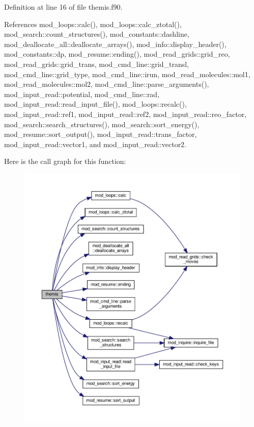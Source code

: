 Definition at line 16 of file themis.\+f90.



References mod\+\_\+loops\+::calc(), mod\+\_\+loops\+::calc\+\_\+ztotal(), mod\+\_\+search\+::count\+\_\+structures(), mod\+\_\+constants\+::dashline, mod\+\_\+deallocate\+\_\+all\+::deallocate\+\_\+arrays(), mod\+\_\+info\+::display\+\_\+header(), mod\+\_\+constants\+::dp, mod\+\_\+resume\+::ending(), mod\+\_\+read\+\_\+grids\+::grid\+\_\+reo, mod\+\_\+read\+\_\+grids\+::grid\+\_\+trans, mod\+\_\+cmd\+\_\+line\+::grid\+\_\+transl, mod\+\_\+cmd\+\_\+line\+::grid\+\_\+type, mod\+\_\+cmd\+\_\+line\+::irun, mod\+\_\+read\+\_\+molecules\+::mol1, mod\+\_\+read\+\_\+molecules\+::mol2, mod\+\_\+cmd\+\_\+line\+::parse\+\_\+arguments(), mod\+\_\+input\+\_\+read\+::potential, mod\+\_\+cmd\+\_\+line\+::rad, mod\+\_\+input\+\_\+read\+::read\+\_\+input\+\_\+file(), mod\+\_\+loops\+::recalc(), mod\+\_\+input\+\_\+read\+::ref1, mod\+\_\+input\+\_\+read\+::ref2, mod\+\_\+input\+\_\+read\+::reo\+\_\+factor, mod\+\_\+search\+::search\+\_\+structures(), mod\+\_\+search\+::sort\+\_\+energy(), mod\+\_\+resume\+::sort\+\_\+output(), mod\+\_\+input\+\_\+read\+::trans\+\_\+factor, mod\+\_\+input\+\_\+read\+::vector1, and mod\+\_\+input\+\_\+read\+::vector2.

Here is the call graph for this function\+:
\nopagebreak
\begin{figure}[H]
\begin{center}
\leavevmode
\includegraphics[width=350pt]{themis_8f90_a9fc0d5fc4c1bc4e9a810629a4d8cf52a_cgraph}
\end{center}
\end{figure}
